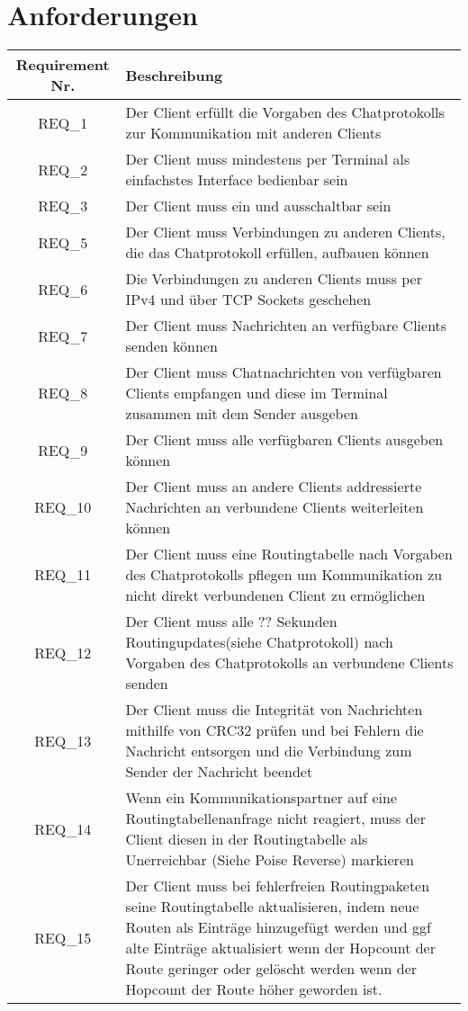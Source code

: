 \section{Anforderungen}

\begin{tabular}{|c|p{13.5cm}|}
\hline
Requirement Nr. & Beschreibung
\\ \hline

REQ\_1 & Der Client erfüllt die Vorgaben des Chatprotokolls zur Kommunikation mit anderen Clients\\
\hline
REQ\_2 & Der Client muss mindestens per Terminal als einfachstes Interface bedienbar sein \\
\hline
REQ\_3 & Der Client muss ein\- und ausschaltbar sein\\
\hline
REQ\_5 & Der Client muss Verbindungen zu anderen Clients, die das Chatprotokoll erfüllen, aufbauen können\\
\hline
REQ\_6 & Die Verbindungen zu anderen Clients muss per IPv4 und über TCP Sockets geschehen\\
\hline
REQ\_7 & Der Client muss Nachrichten an verfügbare Clients senden können\\
\hline
REQ\_8 & Der Client muss Chatnachrichten von verfügbaren Clients empfangen und diese im Terminal zusammen mit dem Sender ausgeben\\
\hline
REQ\_9 & Der Client muss alle verfügbaren Clients ausgeben können\\
\hline
REQ\_10 & Der Client muss an andere Clients addressierte Nachrichten an verbundene Clients weiterleiten können\\
\hline
REQ\_11 & Der Client muss eine Routingtabelle nach Vorgaben des Chatprotokolls pflegen um Kommunikation zu nicht direkt verbundenen Client zu ermöglichen\\
\hline
REQ\_12 & Der Client muss alle ?? Sekunden Routingupdates(siehe Chatprotokoll) nach Vorgaben des Chatprotokolls an verbundene Clients senden\\
\hline
REQ\_13 & Der Client muss die Integrität von Nachrichten mithilfe von CRC32 prüfen und bei Fehlern die Nachricht entsorgen und die Verbindung zum Sender der Nachricht beendet\\
\hline
REQ\_14 & Wenn ein Kommunikationspartner auf eine Routingtabellenanfrage nicht reagiert, muss der Client diesen in der Routingtabelle als Unerreichbar (Siehe Poise Reverse) markieren\\
\hline
REQ\_15 & Der Client muss bei fehlerfreien Routingpaketen seine Routingtabelle aktualisieren, indem neue Routen als Einträge hinzugefügt werden und ggf alte Einträge aktualisiert wenn der Hopcount der Route geringer oder gelöscht werden wenn der Hopcount der Route höher geworden ist.\\
\hline
\end{tabular}
